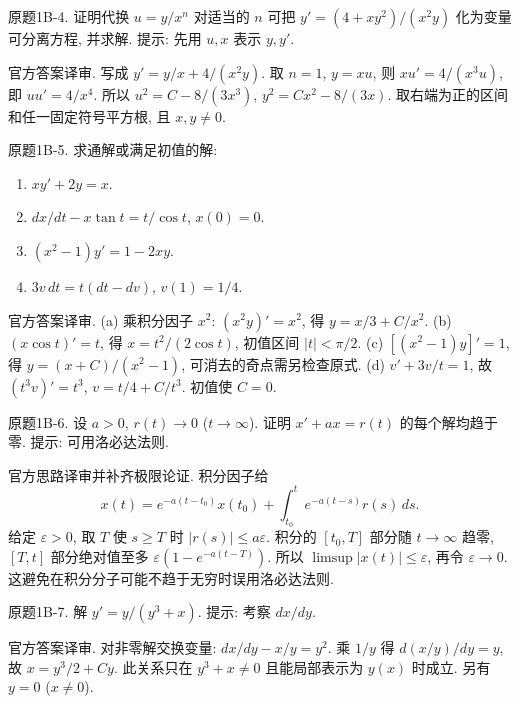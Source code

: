 \begin{exercise}\label{cw:bank-1B-4}
原题1B-4. 证明代换 $u=y/x^n$ 对适当的 $n$ 可把 $y'=(4+xy^2)/(x^2y)$ 化为变量可分离方程, 并求解. 提示: 先用 $u,x$ 表示 $y,y'$.
\end{exercise}
\begin{solution}
官方答案译审. 写成 $y'=y/x+4/(x^2y)$. 取 $n=1$, $y=xu$, 则 $xu'=4/(x^3u)$, 即 $u u'=4/x^4$. 所以 $u^2=C-8/(3x^3)$, $y^2=Cx^2-8/(3x)$. 取右端为正的区间和任一固定符号平方根, 且 $x,y\ne0$.
\end{solution}
\begin{exercise}\label{cw:bank-1B-5}
原题1B-5. 求通解或满足初值的解:
\begin{enumerate}[label=\alph*)]
\item $xy'+2y=x$.
\item $dx/dt-x\tan t=t/\cos t$, $x(0)=0$.
\item $(x^2-1)y'=1-2xy$.
\item $3v\,dt=t(dt-dv)$, $v(1)=1/4$.
\end{enumerate}
\end{exercise}
\begin{solution}
官方答案译审. (a) 乘积分因子 $x^2$: $(x^2y)'=x^2$, 得 $y=x/3+C/x^2$. (b) $(x\cos t)'=t$, 得 $x=t^2/(2\cos t)$, 初值区间 $|t|<\pi/2$. (c) $[(x^2-1)y]'=1$, 得 $y=(x+C)/(x^2-1)$, 可消去的奇点需另检查原式. (d) $v'+3v/t=1$, 故 $(t^3v)'=t^3$, $v=t/4+C/t^3$. 初值使 $C=0$.
\end{solution}
\begin{exercise}\label{cw:bank-1B-6}
原题1B-6. 设 $a>0$, $r(t)\to0$ ($t\to\infty$). 证明 $x'+ax=r(t)$ 的每个解均趋于零. 提示: 可用洛必达法则.
\end{exercise}
\begin{solution}
官方思路译审并补齐极限论证. 积分因子给
\[
 x(t)=e^{-a(t-t_0)}x(t_0)+\int_{t_0}^t e^{-a(t-s)}r(s)\,ds.
\]
给定 $\varepsilon>0$, 取 $T$ 使 $s\ge T$ 时 $|r(s)|\le a\varepsilon$. 积分的 $[t_0,T]$ 部分随 $t\to\infty$ 趋零, $[T,t]$ 部分绝对值至多 $\varepsilon(1-e^{-a(t-T)})$. 所以 $\limsup|x(t)|\le\varepsilon$, 再令 $\varepsilon\to0$. 这避免在积分分子可能不趋于无穷时误用洛必达法则.
\end{solution}
\begin{exercise}\label{cw:bank-1B-7}
原题1B-7. 解 $y'=y/(y^3+x)$. 提示: 考察 $dx/dy$.
\end{exercise}
\begin{solution}
官方答案译审. 对非零解交换变量: $dx/dy-x/y=y^2$. 乘 $1/y$ 得 $d(x/y)/dy=y$, 故 $x=y^3/2+Cy$. 此关系只在 $y^3+x\ne0$ 且能局部表示为 $y(x)$ 时成立. 另有 $y=0$ ($x\ne0$).
\end{solution}

